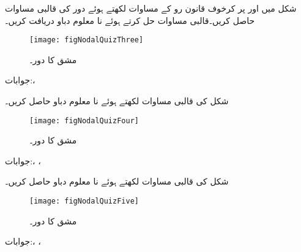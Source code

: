 \FloatBarrier
شکل  میں  اور  پر کرخوف قانون رو کے مساوات لکھتے ہوئے دور کی قالبی مساوات حاصل کریں۔قالبی مساوات حل کرتے ہوئے نا معلوم دباو دریافت کریں۔
\begin{figure}[!h]
\centering
\texttt{[image: figNodalQuizThree]}
\caption{مشق  کا دور۔}
\label{شکل_جوڑ_تیسرا_الف}
\end{figure}

جوابات:، 

شکل  کی قالبی مساوات لکھتے ہوئے نا معلوم دباو حاصل کریں۔
\begin{figure}[!h]
\centering
\texttt{[image: figNodalQuizFour]}
\caption{مشق  کا دور۔}
\label{شکل_جوڑ_تیسرا_ب}
\end{figure}

جوابات:، ،

شکل  کی قالبی مساوات لکھتے ہوئے نا معلوم دباو حاصل کریں۔
\begin{figure}[!h]
\centering
\texttt{[image: figNodalQuizFive]}
\caption{مشق  کا دور۔}
\label{شکل_جوڑ_تیسرا_پ}
\end{figure}

جوابات:، ،
\FloatBarrier

